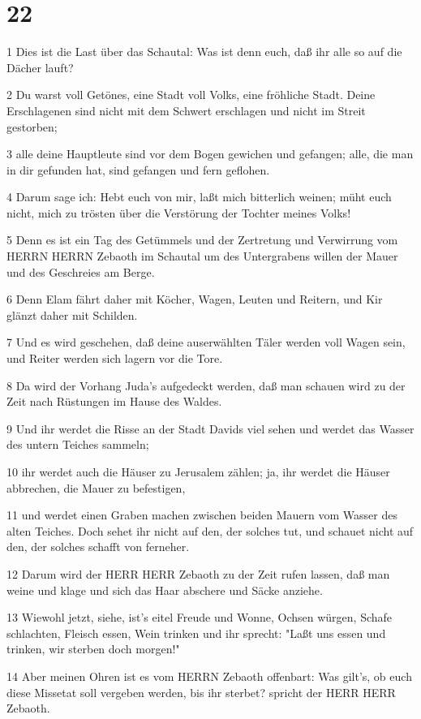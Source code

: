 \chapter{22}

\par 1 Dies ist die Last über das Schautal: Was ist denn euch, daß ihr alle so auf die Dächer lauft?
\par 2 Du warst voll Getönes, eine Stadt voll Volks, eine fröhliche Stadt. Deine Erschlagenen sind nicht mit dem Schwert erschlagen und nicht im Streit gestorben;
\par 3 alle deine Hauptleute sind vor dem Bogen gewichen und gefangen; alle, die man in dir gefunden hat, sind gefangen und fern geflohen.
\par 4 Darum sage ich: Hebt euch von mir, laßt mich bitterlich weinen; müht euch nicht, mich zu trösten über die Verstörung der Tochter meines Volks!
\par 5 Denn es ist ein Tag des Getümmels und der Zertretung und Verwirrung vom HERRN HERRN Zebaoth im Schautal um des Untergrabens willen der Mauer und des Geschreies am Berge.
\par 6 Denn Elam fährt daher mit Köcher, Wagen, Leuten und Reitern, und Kir glänzt daher mit Schilden.
\par 7 Und es wird geschehen, daß deine auserwählten Täler werden voll Wagen sein, und Reiter werden sich lagern vor die Tore.
\par 8 Da wird der Vorhang Juda's aufgedeckt werden, daß man schauen wird zu der Zeit nach Rüstungen im Hause des Waldes.
\par 9 Und ihr werdet die Risse an der Stadt Davids viel sehen und werdet das Wasser des untern Teiches sammeln;
\par 10 ihr werdet auch die Häuser zu Jerusalem zählen; ja, ihr werdet die Häuser abbrechen, die Mauer zu befestigen,
\par 11 und werdet einen Graben machen zwischen beiden Mauern vom Wasser des alten Teiches. Doch sehet ihr nicht auf den, der solches tut, und schauet nicht auf den, der solches schafft von ferneher.
\par 12 Darum wird der HERR HERR Zebaoth zu der Zeit rufen lassen, daß man weine und klage und sich das Haar abschere und Säcke anziehe.
\par 13 Wiewohl jetzt, siehe, ist's eitel Freude und Wonne, Ochsen würgen, Schafe schlachten, Fleisch essen, Wein trinken und ihr sprecht: "Laßt uns essen und trinken, wir sterben doch morgen!"
\par 14 Aber meinen Ohren ist es vom HERRN Zebaoth offenbart: Was gilt's, ob euch diese Missetat soll vergeben werden, bis ihr sterbet? spricht der HERR HERR Zebaoth.
